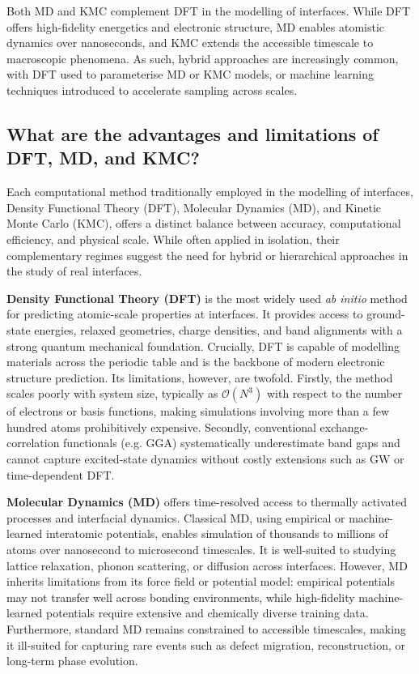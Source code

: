 Both MD and KMC complement DFT in the modelling of interfaces. While DFT offers high-fidelity energetics and
electronic structure, MD enables atomistic dynamics over nanoseconds, and KMC extends the accessible timescale to
macroscopic phenomena. As such, hybrid approaches are increasingly common, with DFT used to parameterise MD or KMC
models, or machine learning techniques introduced to accelerate sampling across scales.

\subsection{What are the advantages and limitations of DFT, MD, and KMC?}

Each computational method traditionally employed in the modelling of interfaces, Density Functional Theory (DFT),
Molecular Dynamics (MD), and Kinetic Monte Carlo (KMC), offers a distinct balance between accuracy, computational
efficiency, and physical scale. While often applied in isolation, their complementary regimes suggest the need for
hybrid or hierarchical approaches in the study of real interfaces.

\textbf{Density Functional Theory (DFT)} is the most widely used \textit{ab initio} method for predicting
atomic-scale properties at interfaces. It provides access to ground-state energies, relaxed geometries, charge
densities, and band alignments with a strong quantum mechanical foundation. Crucially, DFT is capable of modelling
materials across the periodic table and is the backbone of modern electronic structure prediction. Its limitations,
however, are twofold. Firstly, the method scales poorly with system size, typically as $\mathcal{O}(N^3)$ with
respect to the number of electrons or basis functions, making simulations involving more than a few hundred atoms
prohibitively expensive. Secondly, conventional exchange-correlation functionals (e.g. GGA) systematically
underestimate band gaps and cannot capture excited-state dynamics without costly extensions such as GW or
time-dependent DFT.

\textbf{Molecular Dynamics (MD)} offers time-resolved access to thermally activated processes and interfacial dynamics.
Classical MD, using empirical or machine-learned interatomic potentials, enables simulation of thousands to millions of
atoms over nanosecond to microsecond timescales. It is well-suited to studying lattice relaxation, phonon scattering,
or diffusion across interfaces. However, MD inherits limitations from its force field or potential model: empirical
potentials may not transfer well across bonding environments, while high-fidelity machine-learned potentials require
extensive and chemically diverse training data. Furthermore, standard MD remains constrained to accessible timescales,
making it ill-suited for capturing rare events such as defect migration, reconstruction, or long-term phase evolution.


